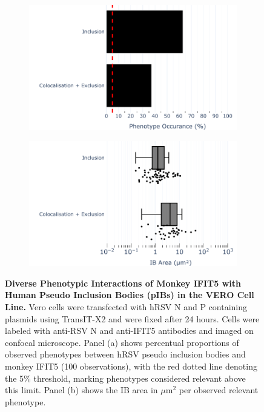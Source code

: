 \begin{figure}
    \begin{subfigure}{0.495\textwidth}
        \caption{}
        \includegraphics[width=1\linewidth]{09. Chapter 4/Figs/01. pIB/05. IFIT5/01. bar_i5_vero.pdf} 
    \end{subfigure}
    \begin{subfigure}{0.495\textwidth}
        \caption{}
        \includegraphics[width=1\linewidth]{09. Chapter 4/Figs/01. pIB/05. IFIT5/02. box_i5_vero.pdf}
    \end{subfigure}
    \caption[Diverse Phenotypic Interactions of Monkey IFIT5 with Human Pseudo Inclusion Bodies (pIBs) in the VERO Cell Line.]{\textbf{Diverse Phenotypic Interactions of Monkey IFIT5 with Human Pseudo Inclusion Bodies (pIBs) in the VERO Cell Line.} Vero cells were transfected with hRSV N and P containing plasmids using TransIT-X2 and were fixed after 24 hours. Cells were labeled with anti-RSV N and anti-IFIT5 antibodies and imaged on confocal microscope. Panel (a) shows percentual proportions of observed phenotypes between hRSV pseudo inclusion bodies and monkey IFIT5 (100 observations), with the red dotted line denoting the 5\% threshold, marking phenotypes considered relevant above this limit. Panel (b) shows the IB area in \(\mu \mbox{m}^2\) per observed relevant phenotype.}
    \label{fig:Diverse Phenotypic Interactions of Monkey IFIT5 with Human Pseudo Inclusion Bodies (pIBs) in the VERO Cell Line}
\end{figure}

